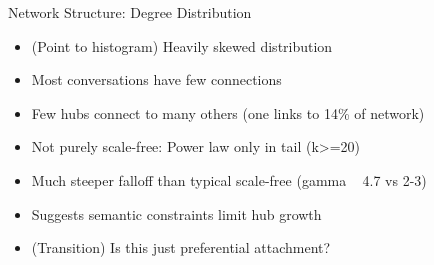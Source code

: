 \documentclass[nodes]{beamer}
\begin{document}
\begin{frame}{Network Structure: Degree Distribution}
{\begin{itemize}
      \item (Point to histogram) Heavily skewed distribution
      \item Most conversations have few connections
      \item Few hubs connect to many others (one links to 14\% of network)
      \item Not purely scale-free: Power law only in tail (k>=20)
      \item Much steeper falloff than typical scale-free (gamma ~ 4.7 vs 2-3)
      \item Suggests semantic constraints limit hub growth
      \item (Transition) Is this just preferential attachment?
    \end{itemize}
  }
\end{frame}
\end{document}
